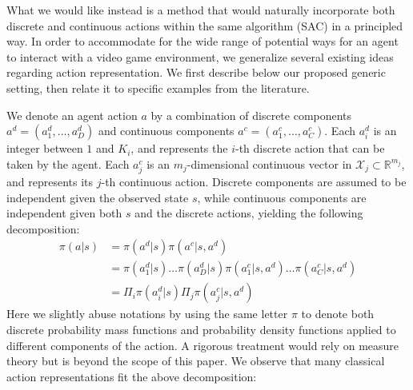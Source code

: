\documentclass[letterpaper]{article} \usepackage{aaai20}  \usepackage{times}  \usepackage{helvet} \usepackage{courier}  \usepackage[hyphens]{url}  \usepackage{graphicx} \urlstyle{rm} \def\UrlFont{\rm}  \usepackage{graphicx}  \usepackage[section]{placeins}
\newcommand{\R}{\mathbb{R}}
\begin{document}
What we would like instead is a method that would naturally incorporate both discrete and continuous actions within the same algorithm (SAC) in a principled way.
In order to accommodate for the wide range of potential ways for an agent to interact with a video game environment, we generalize several existing ideas regarding action representation.
We first describe below our proposed generic setting, then relate it to specific examples from the literature.

We denote an agent action $a$ by a combination of discrete components $a^d = (a^d_1, \ldots, a^d_D)$ and continuous components $a^c = (a^c_1, \ldots, a^c_C)$. Each $a^d_i$ is an integer between $1$ and $K_i$, and represents the $i$-th discrete action that can be taken by the agent. Each $a^c_j$ is an $m_j$-dimensional continuous vector in $\mathcal{X}_j \subset \R^{m_j}$, and represents its $j$-th continuous action.
Discrete components are assumed to be independent given the observed state $s$, while continuous components are independent given both $s$ and the discrete actions, yielding the following decomposition:
\begin{equation*}
\begin{split}
\pi(a | s) & = \pi(a^d | s) \pi(a^c | s, a^d) \\
         & = \pi(a^d_1 | s) \ldots \pi(a^d_D | s) \pi(a^c_1 | s, a^d) \ldots \pi(a^c_C | s, a^d) \\
         & = \Pi_i \pi(a^d_i | s) \Pi_j \pi(a^c_j | s, a^d)
\end{split}
\end{equation*}
Here we slightly abuse notations by using the same letter $\pi$ to denote both discrete probability mass functions and probability density functions applied to different components of the action.
A rigorous treatment would rely on measure theory
but is beyond the scope of this paper.
We observe that many classical action representations fit the above decomposition:
\end{document}
